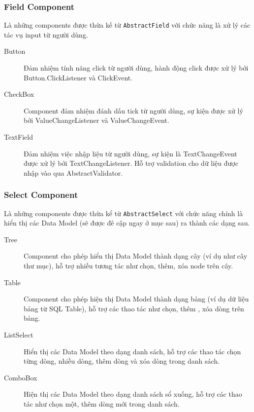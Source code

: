 \subsubsection{Field Component}
Là những components được thừa kế từ \verb|AbstractField| với chức năng là xử lý các tác vụ input từ người dùng.
\begin{description}
\item[Button] Đảm nhiệm tính năng click từ người dùng, hành động click được xử lý bởi Button.ClickListener và ClickEvent.
\item[CheckBox] Component đảm nhiệm đánh dấu tick từ người dùng, sự kiện được xử lý bởi ValueChangeListener và ValueChangeEvent.
\item[TextField] Đảm nhiệm việc nhập liệu từ người dùng, sự kiện là TextChangeEvent được xử lý bởi TextChangeListener. Hỗ trợ validation cho dữ liệu được nhập vào qua AbstractValidator.
\end{description} 
\subsubsection{Select Component}
Là những components được thừa kể từ \verb|AbstractSelect| với chức năng chính là hiển thị các Data Model (sẽ được đê cập ngay ở mục sau) ra thành các dạng sau.
\begin{description}
\item[Tree] Component cho phép hiển thị Data Model thành dạng cây (ví dụ như cây thư mục), hỗ trợ nhiều tương tác như chọn, thêm, xóa node trên cây.
\item[Table] Component cho phép hiện thị Data Model thành dạng bảng (ví dụ dữ liệu bảng từ SQL Table), hỗ trợ các thao tác như chọn, thêm , xóa dòng trên bảng.
\item[ListSelect] Hiển thị các Data Model theo dạng danh sách, hỗ trợ các thao tác chọn từng dòng, nhiều dòng, thêm dòng và xóa dòng trong danh sách.
\item[ComboBox] Hiện thị các Data Model theo dạng danh sách sổ xuống, hỗ trợ các thao tác như chọn một, thêm dòng mới trong danh sách.
\end{description}
